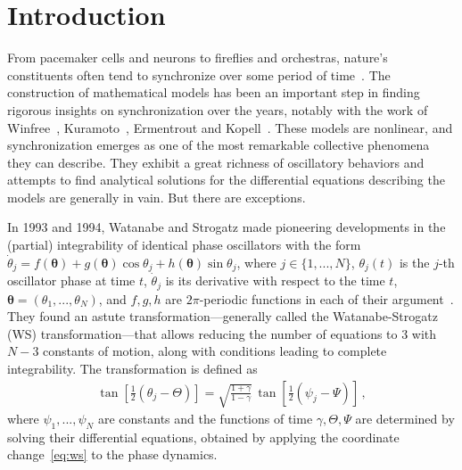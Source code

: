 \documentclass[aps,pre,reprint,longbibliography,superscriptaddress,noshowpacs,floatfix]{revtex4-2}
\theoremstyle{definition}
\theoremstyle{remark}
\begin{document}
\maketitle

\let\oldaddcontentsline\addcontentsline%
\renewcommand{\addcontentsline}[3]{}%


\twocolumngrid


\section*{Introduction}

From pacemaker cells and neurons to fireflies and orchestras, nature’s constituents often tend
to synchronize over some period of time~\cite{Winfree2000, Pikovsky2003, Strogatz2003, Izhikevich2007, Boccaletti2018}. The construction of mathematical models has been an important step in finding rigorous insights on synchronization over the years, notably with the work of Winfree~\cite{Winfree1967}, Kuramoto~\cite{Kuramoto1975}, Ermentrout and Kopell~\cite{Ermentrout1986}. These models are nonlinear, and synchronization emerges as one of the most remarkable
collective phenomena they can describe. They exhibit a great richness of oscillatory behaviors and attempts to find analytical solutions for the differential equations describing the models are generally in vain. But there are exceptions.

In 1993 and 1994, Watanabe and Strogatz made pioneering developments in the (partial) integrability of identical phase oscillators with the form $\dot\theta_j = f(\bm{\theta}) + g(\bm{\theta})\cos\theta_j + h(\bm{\theta})\sin\theta_j$, where $j\in\{1,...,N\}$, $\theta_j(t)$ is the $j$-th oscillator phase at time $t$, $\dot\theta_j$ is its derivative with respect to the time $t$, $\bm{\theta} = (\theta_1,...,\theta_N)$, and $f, g, h$ are $2\pi$-periodic functions in each of their argument~\cite{Watanabe1993, Watanabe1994}. They found an astute transformation---generally called the Watanabe-Strogatz (WS) transformation---that allows reducing the number of equations to 3 with $N - 3$ constants of motion, along with conditions leading to complete integrability. The transformation is defined as
\begin{align}\label{eq:ws}
    \tan[{\textstyle{\frac{1}{2}}}(\theta_j - \Theta)] = \sqrt{\frac{1 + \gamma}{1 - \gamma}}\,\tan[{\textstyle{\frac{1}{2}}}(\psi_j - \Psi)]\,, %
\end{align}
where $\psi_1,...,\psi_N$ are constants and the functions of time $\gamma, \Theta, \Psi$ are determined by solving their differential equations, obtained by applying the coordinate change~\eqref{eq:ws} to the phase dynamics. 
\end{document}
